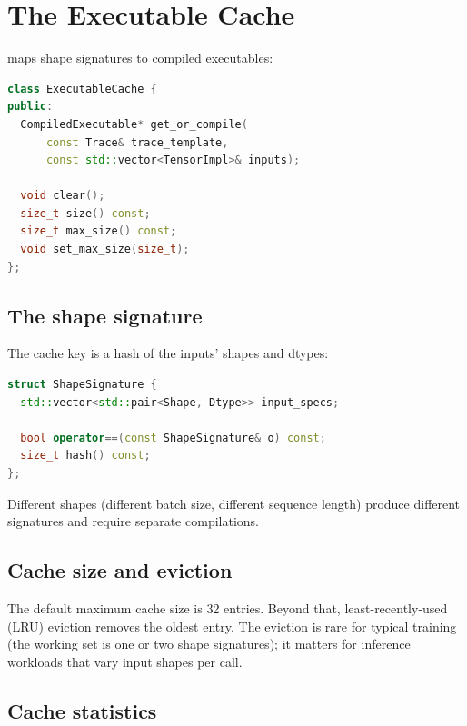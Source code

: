 \section{The Executable Cache}
\label{sec:mps_builder:cache}

 maps shape signatures to compiled
executables:

\begin{lstlisting}[style=lucidcpp,language=C++]
class ExecutableCache {
public:
  CompiledExecutable* get_or_compile(
      const Trace& trace_template,
      const std::vector<TensorImpl>& inputs);

  void clear();
  size_t size() const;
  size_t max_size() const;
  void set_max_size(size_t);
};
\end{lstlisting}

\subsection{The shape signature}
\label{ssec:mps_builder:shape_signature}

The cache key is a hash of the inputs' shapes and dtypes:

\begin{lstlisting}[style=lucidcpp,language=C++]
struct ShapeSignature {
  std::vector<std::pair<Shape, Dtype>> input_specs;

  bool operator==(const ShapeSignature& o) const;
  size_t hash() const;
};
\end{lstlisting}

Different shapes (different batch size, different sequence
length) produce different signatures and require separate
compilations.

\subsection{Cache size and eviction}
\label{ssec:mps_builder:cache_eviction}

The default maximum cache size is 32 entries. Beyond that,
least-recently-used (LRU) eviction removes the oldest entry.
The eviction is rare for typical training (the working set is
one or two shape signatures); it matters for inference workloads
that vary input shapes per call.

\subsection{Cache statistics}
\label{ssec:mps_builder:cache_stats}

